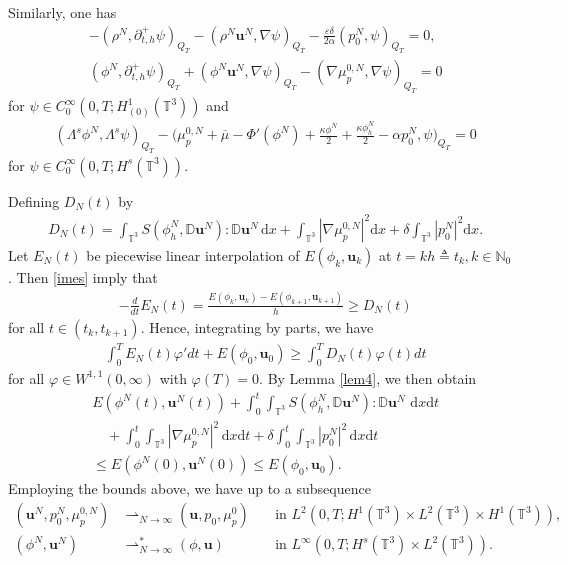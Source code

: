 \documentclass[reqno,a4paper,11pt]{amsart}
\theoremstyle{plain}
\numberwithin{equation}{section}
\renewcommand{\d}{\mathrm{d}}
\newcommand{\dxdt}{\,\d x \d t}
\begin{document}
Similarly, one has
\begin{align}
	\label{weak12-1}
	&-(\rho^{N},\partial_{t,h}^{+}\psi)_{Q_{T}}-(\rho^{N}\mathbf{u}^{N}, \nabla\psi)_{Q_{T}}-\frac{\varepsilon\delta}{2\alpha}(p_{0}^N,\psi)_{Q_{T}}=0,
	\\&\label{weak12-2}
	(\phi^{N},\partial_{t,h}^{+}\psi)_{Q_{T}}+(\phi^{N}\mathbf{u}^{N}, \nabla\psi)_{Q_{T}}-(\nabla\mu_{p}^{0,N}, \nabla\psi)_{Q_{T}}=0
\end{align}
for $\psi\in C_{0}^{\infty}(0,T;H_{(0)}^{1}(\mathbb{T}^{3}))$ and
\begin{align}\label{weak13}
	&(\Lambda^{s}\phi^{N},\Lambda^{s}\psi)_{Q_{T}}-\big(\mu_{p}^{0,N}+\overline{\mu}-\Phi'(\phi^{N})+\frac{\kappa\phi^{N}}{2}+\frac{\kappa\phi_h^{N}}{2}-\alpha p_0^{N}, \psi\big)_{Q_{T}}=0
\end{align}
for $\psi\in C_{0}^{\infty}(0,T;H^{s}(\mathbb{T}^{3}))$.

Defining $D_{N}(t)$ by
\begin{align*}
	&D_{N}(t)=\int_{\mathbb{T}^{3}}S(\phi_{h}^{N},\mathbb{ D}\mathbf{u}^{N}):\mathbb{ D}\mathbf{u}^{N}\,\mathrm dx
	+\int_{\mathbb{T}^{3}}|\nabla \mu_{p}^{0,N}|^{2}\mathrm dx+\delta\int_{\mathbb{T}^{3}}|{p}_0^{N}|^{2}\mathrm dx.
\end{align*}
Let $E_{N}(t)$ be piecewise linear interpolation of $E(\phi_{k},\mathbf{u}_{k})$ at $t=kh\triangleq t_k,k\in\mathbb{N}_{0}$. Then \eqref{imes} imply that
\begin{align*}
	&-\frac{d}{dt}E_{N}(t)=\frac{E(\phi_{k},\mathbf{u}_{k})-E(\phi_{k+1},\mathbf{u}_{k+1})}{h}\geq D_{N}(t)
\end{align*}
for all $t\in(t_{k},t_{k+1})$. Hence, integrating by parts, we have
\begin{align}\label{im11-1}
	&\int_0^{T}E_{N}(t)\varphi' dt+E(\phi_{0},\mathbf{u}_{0})\geq \int_0^{T}D_{N}(t)\varphi(t) dt
\end{align}
for all $\varphi\in W^{1,1}(0,\infty)$ with $\varphi(T)=0$. By Lemma \ref{lem4}, we then obtain
\begin{align}
	&E(\phi^{N}(t),\mathbf{u}^{N}(t))+\int_0^{t}\int_{\mathbb{T}^{3}}S(\phi_{h}^{N},\mathbb{ D}\mathbf{u}^{N}):\mathbb{ D}\mathbf{u}^{N}\,\dxdt\nonumber
	\\&\quad+\int_0^{t}\int_{\mathbb{T}^{3}}|\nabla \mu_{p}^{0,N}|^{2}\dxdt+\delta\int_0^{t}\int_{\mathbb{T}^{3}}|{p}_{0}^{N}|^{2}\dxdt\nonumber \\&\leq E(\phi^{N}(0),\mathbf{u}^{N}(0))\leq E(\phi_0,\mathbf{u}_0).\label{N-energy}
\end{align}
Employing the bounds above, we have up to a subsequence
\begin{align}\label{weak convergence 1}
	(\mathbf{u}^{N},p_{0}^{N},\mu_{p}^{0,N})
	& \rightharpoonup_{N\rightarrow\infty}(\mathbf{u},p_{0},\mu_{p}^{0})\ &&\text{in $L^{2}(0,T;H^{1}(\mathbb{T}^{3})\times L^{2}(\mathbb{T}^{3})\times H^{1}(\mathbb{T}^{3}))$} ,
	\\ (\phi^{N},\mathbf{u}^{N})&\rightharpoonup^{\ast}_{N\rightarrow\infty}(\phi,\mathbf{u}) \  && \text{in  $L^{\infty}(0,T;H^{s}(\mathbb{T}^{3})\times L^{2}(\mathbb{T}^{3}))$}.
\end{align}
\end{document}
